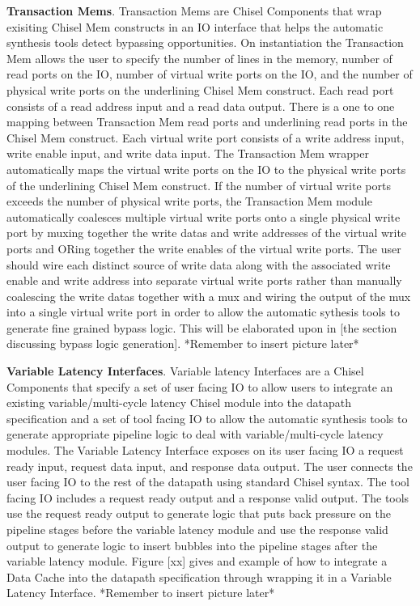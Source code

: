 {\bf Transaction Mems}. Transaction Mems are Chisel Components that
wrap exisiting Chisel Mem constructs in an IO interface that helps the
automatic synthesis tools detect bypassing opportunities. On
instantiation the Transaction Mem allows the user to specify the
number of lines in the memory, number of read ports on the IO, number
of virtual write ports on the IO, and the number of physical write
ports on the underlining Chisel Mem construct. Each read port consists
of a read address input and a read data output. There is a one to one
mapping between Transaction Mem read ports and underlining read ports
in the Chisel Mem construct. Each virtual write port consists of a
write address input, write enable input, and write data input. The
Transaction Mem wrapper automatically maps the virtual write ports on
the IO to the physical write ports of the underlining Chisel Mem
construct. If the number of virtual write ports exceeds the number of
physical write ports, the Transaction Mem module automatically
coalesces multiple virtual write ports onto a single physical write
port by muxing together the write datas and write addresses of the
virtual write ports and ORing together the write enables of the
virtual write ports. The user should wire each distinct source of
write data along with the associated write enable and write address
into separate virtual write ports rather than manually coalescing the
write datas together with a mux and wiring the output of the mux into
a single virtual write port in order to allow the automatic sythesis
tools to generate fine grained bypass logic. This will be elaborated
upon in [the section discussing bypass logic generation]. *Remember to
insert picture later*

{\bf Variable Latency Interfaces}. Variable latency Interfaces are a
Chisel Components that specify a set of user facing IO to allow users
to integrate an existing variable/multi-cycle latency Chisel module
into the datapath specification and a set of tool facing IO to allow
the automatic synthesis tools to generate appropriate pipeline logic
to deal with variable/multi-cycle latency modules. The Variable
Latency Interface exposes on its user facing IO a request ready input,
request data input, and response data output. The user connects the
user facing IO to the rest of the datapath using standard Chisel
syntax. The tool facing IO includes a request ready output and a
response valid output. The tools use the request ready output to
generate logic that puts back pressure on the pipeline stages before
the variable latency module and use the response valid output to
generate logic to insert bubbles into the pipeline stages after the
variable latency module. Figure [xx] gives and example of how to
integrate a Data Cache into the datapath specification through
wrapping it in a Variable Latency Interface. *Remember to insert
picture later*

